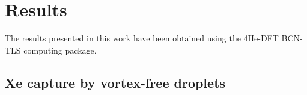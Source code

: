 %

\section{Results}

The results presented in this work have been obtained using the  4He-DFT BCN-TLS computing package.\cite{Pi17}

\subsection{Xe capture by vortex-free droplets}


